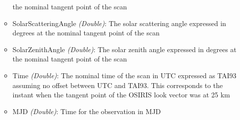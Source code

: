 \begin{itemize}
\begin{itemize}
                the nominal tangent point of the scan
            \item SolarScatteringAngle  \emph{(Double)}: The solar scattering angle expressed in degrees
                at the nominal tangent point of the scan
            \item SolarZenithAngle      \emph{(Double)}: The solar zenith angle expressed in degrees at
                the nominal tangent point of the scan
            \item Time                  \emph{(Double)}: The nominal time of the scan in UTC expressed as
                TAI93 assuming no offset between UTC and TAI93. This corresponds to the instant when the
                tangent point of the OSIRIS look vector was at 25 km
            \item MJD \emph{(Double)}: Time for the observation in MJD
        \end{itemize}
\end{itemize}

